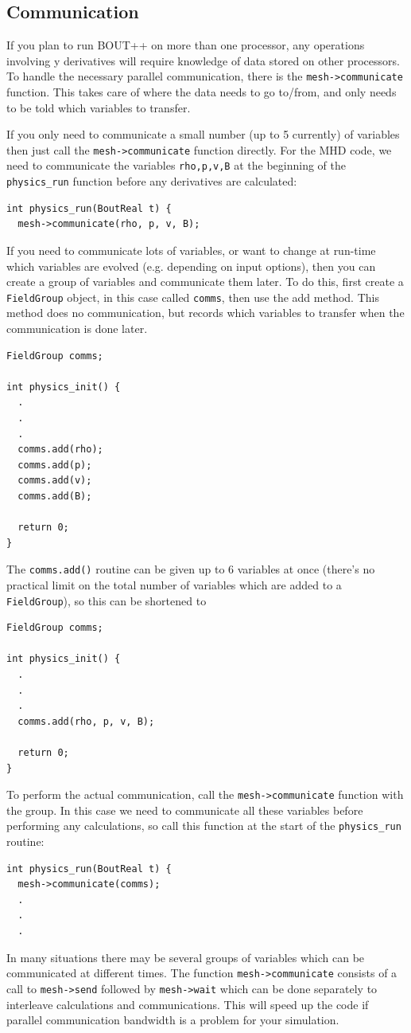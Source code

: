 \documentclass[12pt]{article}
\newcommand{\code}[1]{\texttt{#1}}
\begin{document}
\subsection{Communication}
If you plan to run BOUT++ on more than one processor, any operations involving y derivatives
will require knowledge of data stored on other processors. To handle the necessary parallel
communication, there is the \code{mesh->communicate} function. This takes care of where the data
needs to go to/from, and only needs to be told which variables to transfer.

If you only need to communicate a small number (up to 5 currently) of variables then just
call the \code{mesh->communicate} function directly. For the MHD code, we need to communicate
the variables \code{rho,p,v,B} at the beginning of the \code{physics\_run} function
before any derivatives are calculated:
\begin{lstlisting}
int physics_run(BoutReal t) {
  mesh->communicate(rho, p, v, B);
\end{lstlisting}

If you need to communicate lots of variables, or want to change at run-time which
variables are evolved (e.g. depending on input options), then you can create a group
of variables and communicate them later.
To do this, first create a \code{FieldGroup} object, in this case called \code{comms},
then use the add method. This method does no communication, but records which variables to transfer
when the communication is done later.
\begin{lstlisting}
FieldGroup comms;

int physics_init() {
  .
  .
  .
  comms.add(rho);
  comms.add(p);
  comms.add(v);
  comms.add(B);

  return 0;
}
\end{lstlisting}

The \lstinline!comms.add()! routine can be given up to 6 variables at once (there's no practical
limit on the total number of variables which are added to a \lstinline!FieldGroup!), so this can be
shortened to
\begin{lstlisting}
FieldGroup comms;

int physics_init() {
  .
  .
  .
  comms.add(rho, p, v, B);

  return 0;
}
\end{lstlisting}

To perform the actual communication, call the \code{mesh->communicate} function
with the group. In this case
we need to communicate all these variables before performing any calculations, so call
this function at the start of the \code{physics\_run} routine:
\begin{lstlisting}
int physics_run(BoutReal t) {
  mesh->communicate(comms);
  .
  .
  .
\end{lstlisting}
In many situations there may be several groups of variables which can be communicated at
different times. The function \code{mesh->communicate} consists of a call to \code{mesh->send} followed by \code{mesh->wait}
which can be done separately to interleave calculations and communications. This will speed up the
code if parallel communication bandwidth is a problem for your simulation.
\end{document}
